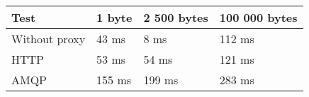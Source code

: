 \begin{tabularx}{\textwidth}{llll}
\hline
 Test          & 1 byte   & 2 500 bytes   & 100 000 bytes   \\
\hline
 Without proxy & 43 ms    & 8 ms          & 112 ms          \\
 HTTP          & 53 ms    & 54 ms         & 121 ms          \\
 AMQP          & 155 ms   & 199 ms        & 283 ms          \\
\hline
\end{tabularx}